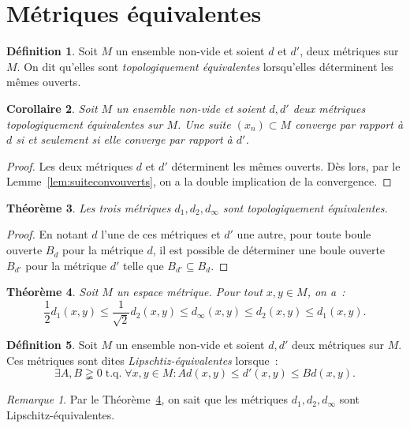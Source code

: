 \documentclass{report}
\newtheorem{thm}{Théorème}[chapter]
\newtheorem{cor}[thm]{Corollaire}
\theoremstyle{definition}
\newtheorem{déf}[thm]{Définition}
\theoremstyle{remark}
\newtheorem*{rmq}{Remarque}
\DeclareMathOperator{\tq}{\text{ t.q. }}
\begin{document}
	\section{Métriques équivalentes}
		\begin{déf} Soit $M$ un ensemble non-vide et soient $d$ et $d'$, deux métriques sur $M$. On dit qu'elles sont \textit{topologiquement équivalentes} lorsqu'elles
		déterminent les mêmes ouverts.
		\end{déf}

		\begin{cor} Soit $M$ un ensemble non-vide et soient $d, d'$ deux métriques topologiquement équivalentes sur $M$. Une suite $(x_n) \subset M$ converge par
		rapport à $d$ si et seulement si elle converge par rapport à $d'$.
		\end{cor}

		\begin{proof} Les deux métriques $d$ et $d'$ déterminent les mêmes ouverts. Dès lors, par le Lemme~\ref{lem:suiteconvouverts}, on a la double implication
		de la convergence.
		\end{proof}

		\begin{thm} Les trois métriques $d_1, d_2, d_\infty$ sont topologiquement équivalentes.
		\end{thm}

		\begin{proof} En notant $d$ l'une de ces métriques et $d'$ une autre, pour toute boule ouverte $B_d$ pour la métrique $d$, il est possible de déterminer une
		boule ouverte $B_{d'}$ pour la métrique $d'$ telle que $B_{d'} \subseteq B_d$.
		\end{proof}

		\begin{thm}\label{thm:d1d2dinflipschitzeq} Soit $M$ un espace métrique. Pour tout $x, y \in M$, on a~:
		\[\frac 12 d_1(x, y) \leq \frac 1{\sqrt 2}d_2(x, y) \leq d_\infty(x, y) \leq d_2(x, y) \leq d_1(x, y).\]
		\end{thm}

		\begin{déf} Soit $M$ un ensemble non-vide et soient $d, d'$ deux métriques sur $M$. Ces métriques sont dites \textit{Lipschtiz-équivalentes} lorsque~:
		\[\exists A, B \gneqq 0 \tq \forall x, y \in M : Ad(x, y) \leq d'(x, y) \leq Bd(x, y).\]
		\end{déf}

		\begin{rmq} Par le Théorème~\ref{thm:d1d2dinflipschitzeq}, on sait que les métriques $d_1, d_2, d_\infty$ sont Lipschitz-équivalentes.
		\end{rmq}
\end{document}
